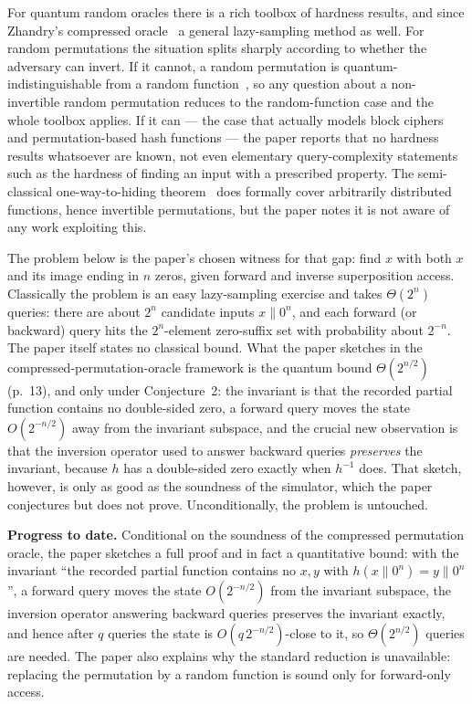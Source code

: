 \documentclass{conjura-conjecture}
\begin{document}
For quantum random oracles there is a rich toolbox of hardness
results, and since Zhandry's compressed oracle~\cite{Zha19} a general
lazy-sampling method as well. For random permutations the situation
splits sharply according to whether the adversary can invert. If it
cannot, a random permutation is quantum-indistinguishable from a
random function~\cite{Zha15}, so any question about a non-invertible
random permutation reduces to the random-function case and the whole
toolbox applies. If it can --- the case that actually models block
ciphers and permutation-based hash functions --- the paper reports
that no hardness results whatsoever are known, not even elementary
query-complexity statements such as the hardness of finding an input
with a prescribed property. The semi-classical one-way-to-hiding
theorem~\cite{AHU19} does formally cover arbitrarily distributed
functions, hence invertible permutations, but the paper notes it is
not aware of any work exploiting this.

The problem below is the paper's chosen witness for that gap: find $x$
with both $x$ and its image ending in $n$ zeros, given forward and
inverse superposition access. Classically the problem is an easy
lazy-sampling exercise and takes $\Theta(2^n)$ queries: there are
about $2^n$ candidate inputs $x \| 0^n$, and each forward (or
backward) query hits the $2^n$-element zero-suffix set with
probability about $2^{-n}$. The paper itself states no classical
bound. What the paper sketches in the compressed-permutation-oracle
framework is the quantum bound $\Theta(2^{n/2})$ (p.~13), and only
under Conjecture~2: the invariant is that the recorded partial
function contains no double-sided zero, a forward query moves the
state $O(2^{-n/2})$ away from the invariant subspace, and the crucial
new observation is that the inversion operator used to answer backward
queries \emph{preserves} the invariant, because $h$ has a double-sided
zero exactly when $h^{-1}$ does. That sketch, however, is only as good
as the soundness of the simulator, which the paper conjectures but
does not prove. Unconditionally, the problem is untouched.

\textbf{Progress to date.} Conditional on the soundness of the
compressed permutation oracle, the paper sketches a full proof and in
fact a quantitative bound: with the invariant ``the recorded partial
function contains no $x, y$ with $h(x\|0^n) = y\|0^n$'', a forward
query moves the state $O(2^{-n/2})$ from the invariant subspace, the
inversion operator answering backward queries preserves the invariant
exactly, and hence after $q$ queries the state is
$O(q\, 2^{-n/2})$-close to it, so $\Theta(2^{n/2})$ queries are
needed. The paper also explains why the standard reduction is
unavailable: replacing the permutation by a random function is sound
only for forward-only access.
\end{document}
